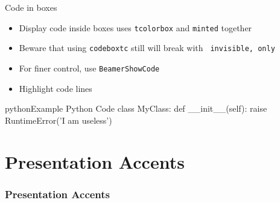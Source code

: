 \documentclass[xcolor={dvipsnames}, aspectratio=169]{beamer}
\begin{document}
\begin{frame}[fragile]{Code in boxes}
  \begin{minipage}{0.45\textwidth}
    \centering
    \begin{itemize}
      \item<1-> Display code inside boxes uses \texttt{tcolorbox} and
        \texttt{minted} together
      \item<1-> Beware that using \texttt{codeboxtc} still will break with \texttt{
          invisible, only
        }
      \item<2-> For finer control, use \texttt{BeamerShowCode}
      \item<3-> Highlight code lines
    \end{itemize}
  \end{minipage}
  \begin{minipage}{0.5\textwidth}
    \begin{center}
    \begin{codeboxtc}{python}{Example Python Code}{}{}
      class MyClass:
        def __init__(self):
          raise RuntimeError('I am useless')
    \end{codeboxtc}
   \end{center}
  \end{minipage}
\end{frame}


\part[Boxes]{Presentation Accents}
\section{Presentation Accents}
\end{document}
